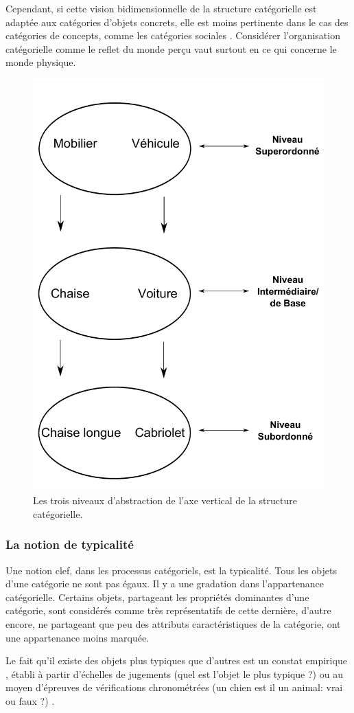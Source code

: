 Cependant, si cette vision bidimensionnelle de la structure catégorielle est adaptée aux catégories d'objets concrets, elle est moins pertinente dans le cas des catégories de concepts, comme les catégories sociales \citep[p. 72-88]{dubois1991semantique}. Considérer l'organisation catégorielle comme le reflet du monde perçu vaut surtout en ce qui concerne le monde physique.

\begin{figure}[t]
        \myfloatalign
        \includegraphics[width=.6\linewidth]{gfx/categorieLVL}
        \caption{Les trois niveaux d'abstraction de l'axe vertical de la structure catégorielle.}\label{fig:categorieLVL}
\end{figure}

\subsubsection{La notion de typicalité}
\label{sec:ch3_typicité}

Une notion clef, dans les processus catégoriels, est la typicalité. Tous les objets d'une catégorie ne sont pas égaux. Il y a une gradation dans l'appartenance catégorielle. Certains objets, partageant les propriétés dominantes d'une catégorie, sont considérés comme très représentatifs de cette dernière, d'autre encore, ne partageant que peu des attributs caractéristiques de la catégorie, ont une appartenance moins marquée.

Le fait qu'il existe des objets plus typiques que d'autres est un constat empirique \citep[p. 37]{rosch1978cognition,mervis1981categorization}, établi à partir d'échelles de jugements (quel est l'objet le plus typique ?) ou au moyen d'épreuves de vérifications chronométrées (un chien est il un animal: vrai ou faux ?) \citep[p. 41]{dubois1991semantique}.

